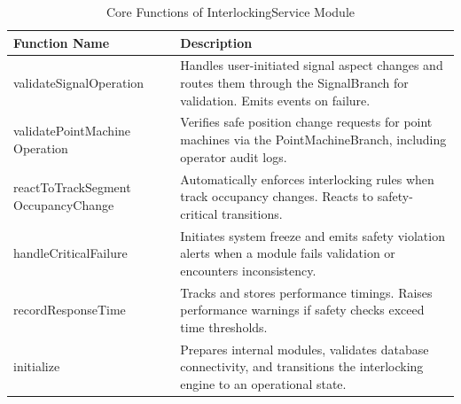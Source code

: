 \begin{table}[H]
    \centering
    \renewcommand{\arraystretch}{1.3}
    \caption{Core Functions of InterlockingService Module}
    \begin{tabular}{|p{4.8cm}|p{10.2cm}|}
        \hline
        \textbf{Function Name} & \textbf{Description} \\\hline
        validateSignalOperation &
        Handles user-initiated signal aspect changes and routes them through the SignalBranch for validation. Emits events on failure. \\\hline

        validatePointMachine \newline Operation &
        Verifies safe position change requests for point machines via the PointMachineBranch, including operator audit logs. \\\hline

        reactToTrackSegment \newline OccupancyChange &
        Automatically enforces interlocking rules when track occupancy changes. Reacts to safety-critical transitions. \\\hline

        handleCriticalFailure&
        Initiates system freeze and emits safety violation alerts when a module fails validation or encounters inconsistency. \\\hline

        recordResponseTime &
        Tracks and stores performance timings. Raises performance warnings if safety checks exceed time thresholds. \\\hline

        initialize&
        Prepares internal modules, validates database connectivity, and transitions the interlocking engine to an operational state. \\\hline
    \end{tabular}
    \label{tab:interlocking-service}
\end{table}

